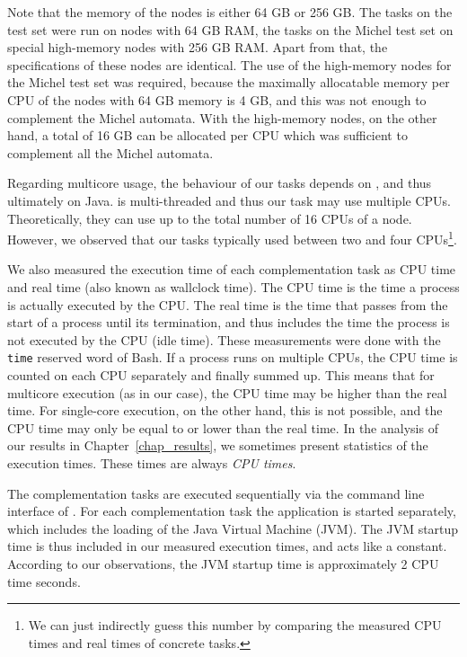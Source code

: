 Note that the memory of the nodes is either 64 GB or 256 GB. The tasks on the \goal{} test set were run on nodes with 64 GB RAM, the tasks on the Michel test set on special high-memory nodes with 256 GB RAM. Apart from that, the specifications of these nodes are identical. The use of the high-memory nodes for the Michel test set was required, because the maximally allocatable memory per CPU of the nodes with 64 GB memory is 4 GB, and this was not enough to complement the Michel automata. With the high-memory nodes, on the other hand, a total of 16 GB can be allocated per CPU which was sufficient to complement all the Michel automata.

Regarding multicore usage, the behaviour of our tasks depends on \goal, and thus ultimately on Java. \goal{} is multi-threaded and thus our task may use  multiple CPUs. Theoretically, they can use up to the total number of 16 CPUs of a node. However, we observed that our tasks typically used between two and four CPUs\footnote{We can just indirectly guess this number by comparing the measured CPU times and real times of concrete tasks.}.

We also measured the execution time of each complementation task as CPU time and real time (also known as wallclock time). The CPU time is the time a process is actually executed by the CPU. The real time is the time that passes from the start of a process until its termination, and thus includes the time the process is not executed by the CPU (idle time). These measurements were done with the \texttt{time} reserved word of Bash. If a process runs on multiple CPUs, the CPU time is counted on each CPU separately and finally summed up. This means that for multicore execution (as in our case), the CPU time may be higher than the real time. For single-core execution, on the other hand, this is not possible, and the CPU time may only be equal to or lower than the real time. In the analysis of our results in Chapter~\ref{chap_results}, we sometimes present statistics of the execution times. These times are always \textit{CPU times}.

The complementation tasks are executed sequentially via the command line interface of \goal. For each complementation task the \goal{} application is started separately, which includes the loading of the Java Virtual Machine (JVM). The JVM startup time is thus included in our measured execution times, and acts like a constant. According to our observations, the JVM startup time is approximately 2 CPU time seconds.

